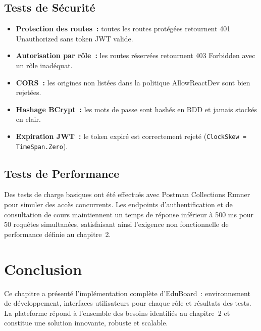\subsection{Tests de Sécurité}

\begin{itemize}
  \item \textbf{Protection des routes~:} toutes les routes protégées retournent 401
        Unauthorized sans token JWT valide.
  \item \textbf{Autorisation par rôle~:} les routes réservées retournent 403 Forbidden
        avec un rôle inadéquat.
  \item \textbf{CORS~:} les origines non listées dans la politique AllowReactDev sont
        bien rejetées.
  \item \textbf{Hashage BCrypt~:} les mots de passe sont hashés en BDD et jamais
        stockés en clair.
  \item \textbf{Expiration JWT~:} le token expiré est correctement rejeté
        (\texttt{ClockSkew = TimeSpan.Zero}).
\end{itemize}

\subsection{Tests de Performance}

Des tests de charge basiques ont été effectués avec Postman Collections Runner pour
simuler des accès concurrents. Les endpoints d'authentification et de consultation de
cours maintiennent un temps de réponse inférieur à 500 ms pour 50 requêtes
simultanées, satisfaisant ainsi l'exigence non fonctionnelle de performance définie
au chapitre~2.

\section*{Conclusion}

Ce chapitre a présenté l'implémentation complète d'EduBoard~: environnement de
développement, interfaces utilisateurs pour chaque rôle et résultats des tests. La
plateforme répond à l'ensemble des besoins identifiés au chapitre~2 et constitue une
solution innovante, robuste et scalable.
